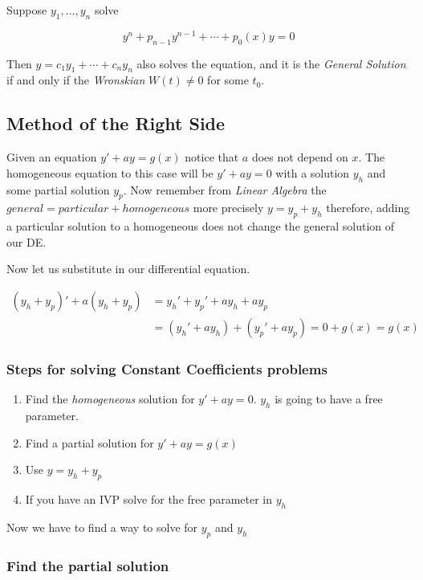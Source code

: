 Suppose \(y_1, \dots, y_n\) solve 

\[y^{n} + p_{n - 1}y^{n - 1}+ \cdots + p_0 (x)y = 0\]

Then \(y = c_1 y_1 + \cdots + c_n y_n\) also solves the equation, and it is the 
\emph{General Solution} if and only if the \emph{Wronskian} \(W(t) \ne 0\) for some \(t_0\).


\subsection{Method of the Right Side}

Given an equation \(y' + ay = g(x)\) notice that \(a\) does not depend on \(x\).
The homogeneous equation to this case will be \(y' + ay = 0\) with a solution \(y_h\) and some
partial solution \(y_p\). Now remember from \emph{Linear Algebra} the \(general = particular + homogeneous\)
more precisely \(y = y_p + y_h\) therefore, adding a particular solution to a homogeneous does not change
the general solution of our DE.
\vspace{\baselineskip}

Now let us substitute in our differential equation.

\begin{align*}
(y_h + y_p)' + a(y_h + y_p) &= y_h' + y_p' + ay_h + ay_p\\   
&= (y_h' + ay_h) + (y_p' + ay_p) = 0 + g(x) = g(x) 
\end{align*}

\subsubsection{Steps for solving Constant Coefficients problems}
\begin{enumerate}
    \item Find the \emph{homogeneous} solution for \(y' + ay = 0\). \(y_h\) is going
    to have a free parameter.
    \item Find a partial solution for \(y' + ay = g(x)\)
    \item Use \(y = y_h + y_p\)
    \item If you have an IVP solve for the free parameter in \(y_h\)
\end{enumerate}

Now we have to find a way to solve for \(y_p\) and \(y_h\)

\subsubsection{Find the partial solution}

